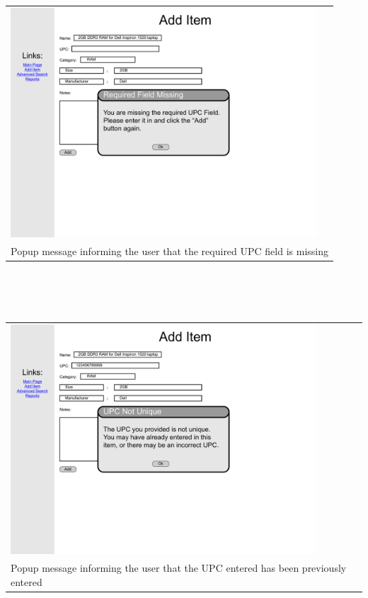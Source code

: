 \documentclass{article}
\begin{document}
\begin{tabular}{ p{4.5in} }
\includegraphics[keepaspectratio, width=4.5in]{addItemF1S5.pdf} \\
Popup message informing the user that the required UPC field is missing
\end{tabular}\\
~\\
~\\
\begin{tabular}{ p{4.5in} }
\includegraphics[keepaspectratio, width=4.5in]{addItemF2S5.pdf} \\
Popup message informing the user that the UPC entered has been previously entered
\end{tabular}
~\\
~\\
\end{document}
